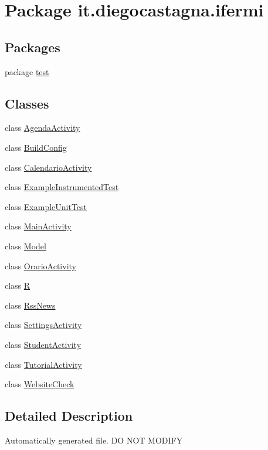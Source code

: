 \hypertarget{namespaceit_1_1diegocastagna_1_1ifermi}{}\section{Package it.\+diegocastagna.\+ifermi}
\label{namespaceit_1_1diegocastagna_1_1ifermi}
\subsection*{Packages}
\begin{DoxyCompactItemize}
\item 
package \mbox{\hyperlink{namespaceit_1_1diegocastagna_1_1ifermi_1_1test}{test}}
\end{DoxyCompactItemize}
\subsection*{Classes}
\begin{DoxyCompactItemize}
\item 
class \mbox{\hyperlink{classit_1_1diegocastagna_1_1ifermi_1_1_agenda_activity}{Agenda\+Activity}}
\item 
class \mbox{\hyperlink{classit_1_1diegocastagna_1_1ifermi_1_1_build_config}{Build\+Config}}
\item 
class \mbox{\hyperlink{classit_1_1diegocastagna_1_1ifermi_1_1_calendario_activity}{Calendario\+Activity}}
\item 
class \mbox{\hyperlink{classit_1_1diegocastagna_1_1ifermi_1_1_example_instrumented_test}{Example\+Instrumented\+Test}}
\item 
class \mbox{\hyperlink{classit_1_1diegocastagna_1_1ifermi_1_1_example_unit_test}{Example\+Unit\+Test}}
\item 
class \mbox{\hyperlink{classit_1_1diegocastagna_1_1ifermi_1_1_main_activity}{Main\+Activity}}
\item 
class \mbox{\hyperlink{classit_1_1diegocastagna_1_1ifermi_1_1_model}{Model}}
\item 
class \mbox{\hyperlink{classit_1_1diegocastagna_1_1ifermi_1_1_orario_activity}{Orario\+Activity}}
\item 
class \mbox{\hyperlink{classit_1_1diegocastagna_1_1ifermi_1_1_r}{R}}
\item 
class \mbox{\hyperlink{classit_1_1diegocastagna_1_1ifermi_1_1_rss_news}{Rss\+News}}
\item 
class \mbox{\hyperlink{classit_1_1diegocastagna_1_1ifermi_1_1_settings_activity}{Settings\+Activity}}
\item 
class \mbox{\hyperlink{classit_1_1diegocastagna_1_1ifermi_1_1_student_activity}{Student\+Activity}}
\item 
class \mbox{\hyperlink{classit_1_1diegocastagna_1_1ifermi_1_1_tutorial_activity}{Tutorial\+Activity}}
\item 
class \mbox{\hyperlink{classit_1_1diegocastagna_1_1ifermi_1_1_website_check}{Website\+Check}}
\end{DoxyCompactItemize}


\subsection{Detailed Description}
Automatically generated file. DO N\+OT M\+O\+D\+I\+FY 